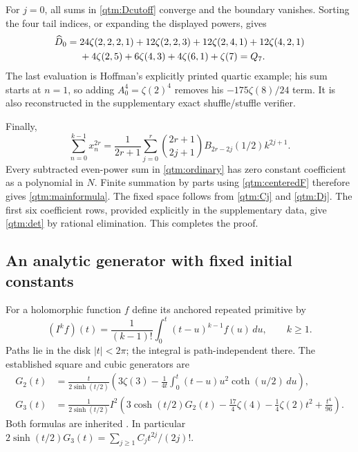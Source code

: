 \documentclass[11pt,a4paper]{article}
\numberwithin{equation}{section}
\theoremstyle{plain}
\theoremstyle{definition}
\theoremstyle{remark}
\begin{document}
For $j=0$, all sums in \eqref{qtm:Dcutoff} converge and the
boundary vanishes.  Sorting the four tail indices, or expanding the
displayed powers, gives
\begin{align}\label{qtm:D0MZV}
 \widehat D_0={}&24\zeta(2,2,2,1)+12\zeta(2,2,3)
              +12\zeta(2,4,1)+12\zeta(4,2,1)\notag\\
             &+4\zeta(2,5)+6\zeta(4,3)+4\zeta(6,1)+\zeta(7)
              =Q_7.
\end{align}
The last evaluation is Hoffman's explicitly printed quartic example;
his sum starts at $n=1$, so adding $A_0^4=\zeta(2)^4$ removes
his $-175\zeta(8)/24$ term.  It is also reconstructed in the
supplementary exact shuffle/stuffle verifier.

Finally,
\begin{equation}\label{qtm:centeredF}
 \sum_{n=0}^{k-1}x_n^{2r}
  =\frac1{2r+1}\sum_{j=0}^{r}
   \binom{2r+1}{2j+1}B_{2r-2j}(1/2)k^{2j+1}.
\end{equation}
Every subtracted even-power sum in \eqref{qtm:ordinary} has zero
constant coefficient as a polynomial in $N$.  Finite summation by
parts using \eqref{qtm:centeredF} therefore gives
\eqref{qtm:mainformula}.  The fixed space follows from
\eqref{qtm:Cj} and \eqref{qtm:Dj}.  The first six coefficient rows,
provided explicitly in the supplementary data, give
\eqref{qtm:det} by rational elimination.  This completes the proof.

\subsection{An analytic generator with fixed initial constants}

For a holomorphic function $f$ define its anchored repeated primitive by
\begin{equation}\label{qtm:Ik}
 (I^kf)(t)=\frac1{(k-1)!}\int_0^t(t-u)^{k-1}f(u)\,du,
 \qquad k\ge1.
\end{equation}
Paths lie in the disk $|t|<2\pi$; the integral is path-independent
there.  The established square and cubic generators are
\begin{align}
 G_2(t)&=\frac{t}{2\sinh(t/2)}
 \left(3\zeta(3)-\frac1{4t}
       \int_0^t(t-u)u^2\coth(u/2)\,du\right),
       \label{qtm:G2}\\
 G_3(t)&=\frac1{2\sinh(t/2)}I^2
 \left(3\cosh(t/2)G_2(t)-\frac{17}{4}\zeta(4)
                 -\frac14\zeta(2)t^2+\frac{t^4}{96}\right).
       \label{qtm:G3}
\end{align}
Both formulas are inherited \cite{Square,Reconstruction}.
In particular $2\sinh(t/2)G_3(t)=\sum_{j\ge1}C_jt^{2j}/(2j)!$.
\end{document}
